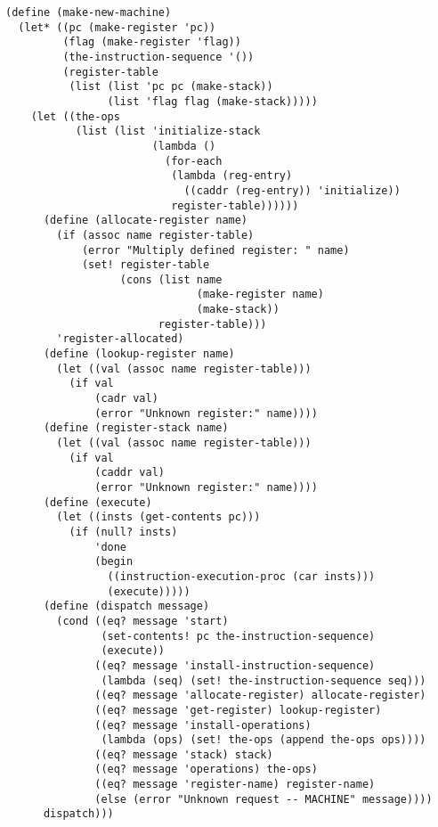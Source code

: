 \documentclass[a4paper,12pt]{article}
\begin{document}
\begin{lstlisting}
(define (make-new-machine)
  (let* ((pc (make-register 'pc))
         (flag (make-register 'flag))
         (the-instruction-sequence '())
         (register-table
          (list (list 'pc pc (make-stack))
                (list 'flag flag (make-stack)))))
    (let ((the-ops
           (list (list 'initialize-stack
                       (lambda ()
                         (for-each
                          (lambda (reg-entry)
                            ((caddr (reg-entry)) 'initialize))
                          register-table))))))
      (define (allocate-register name)
        (if (assoc name register-table)
            (error "Multiply defined register: " name)
            (set! register-table
                  (cons (list name
                              (make-register name)
                              (make-stack))
                        register-table)))
        'register-allocated)
      (define (lookup-register name)
        (let ((val (assoc name register-table)))
          (if val
              (cadr val)
              (error "Unknown register:" name))))
      (define (register-stack name)
        (let ((val (assoc name register-table)))
          (if val
              (caddr val)
              (error "Unknown register:" name))))
      (define (execute)
        (let ((insts (get-contents pc)))
          (if (null? insts)
              'done
              (begin
                ((instruction-execution-proc (car insts)))
                (execute)))))
      (define (dispatch message)
        (cond ((eq? message 'start)
               (set-contents! pc the-instruction-sequence)
               (execute))
              ((eq? message 'install-instruction-sequence)
               (lambda (seq) (set! the-instruction-sequence seq)))
              ((eq? message 'allocate-register) allocate-register)
              ((eq? message 'get-register) lookup-register)
              ((eq? message 'install-operations)
               (lambda (ops) (set! the-ops (append the-ops ops))))
              ((eq? message 'stack) stack)
              ((eq? message 'operations) the-ops)
              ((eq? message 'register-name) register-name)
              (else (error "Unknown request -- MACHINE" message))))
      dispatch)))
\end{lstlisting}
\end{document}
